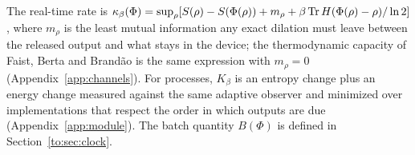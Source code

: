 The real-time rate is $\kappa_\beta(\Phi)=\sup_\rho[S(\rho)-S(\Phi(\rho))+m_\rho+\beta\operatorname{Tr} H(\Phi(\rho)-\rho)/\ln2]$, where $m_\rho$ is the least mutual information any exact dilation must leave between the released output and what stays in the device; the thermodynamic capacity of Faist, Berta and Brand\~ao is the same expression with $m_\rho=0$~\cite{FBB19,FBB21} (Appendix~\ref{app:channels}). For processes, $K_\beta$ is an entropy change plus an energy change measured against the same adaptive observer and minimized over implementations that respect the order in which outputs are due (Appendix~\ref{app:module}). The batch quantity $B(\Phi)$ is defined in Section~\ref{to:sec:clock}.

